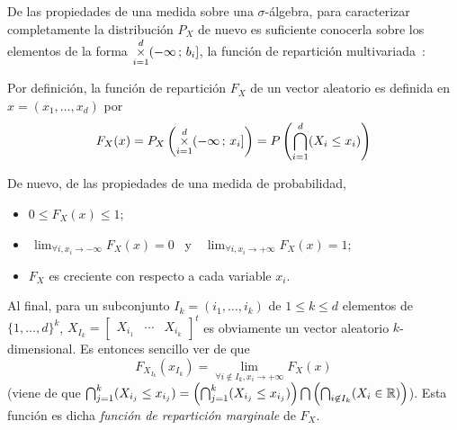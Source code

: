 De las propiedades de una medida sobre una $\sigma$-\'algebra, para caracterizar
completamente la distribuci\'on $P_X$ de nuevo es suficiente conocerla sobre los
elementos de  la forma $\displaystyle  \operatorname*{\times}_{i=1}^d (-\infty \, ;  \, b_i]$,
\ie  la funci\'on  de repartici\'on  multivariada~\cite{AthLah06,  Coh13, Bre88,
  HogMck13}:
%
\begin{definicion}
  Por  definici\'on,  la  funci\'on  de  repartici\'on  $F_X$  de  un vector
  aleatorio es definida en $x = (x_1 , \ldots , x_d)$ por
  \[
  F_X(x) =  P_X\left( \operatorname*{\times}_{i=1}^d (-\infty \,  ; \, x_i]  \right) = P\left(
    \bigcap_{i=1}^d (X_i \le x_i) \right)
  \]
\end{definicion}
%
De nuevo, de las propiedades de una medida de probabilidad,
%
\begin{itemize}
\item $0 \le F_X(x) \le 1$;
%
\item $\displaystyle  \, \lim_{\forall  i, x_i \to  -\infty} F_X(x)  = 0$ \  y \
  $\displaystyle \, \lim_{\forall i, x_i \to +\infty} F_X(x) = 1$;
%
\item $F_X$ es creciente con respecto a cada variable $x_i$.
\end{itemize}
%
Al  final, para  un subconjunto  $I_k =  (i_1,\ldots,i_k)$ de  $1 \le  k  \le d$
elementos de  $\{ 1  , \ldots ,  d \}^k$,  $X_{I_k} = \begin{bmatrix}  X_{i_1} &
  \cdots   &   X_{i_k}\end{bmatrix}^t$  es   obviamente   un  vector   aleatorio
$k$-dimensional. Es entonces sencillo ver de que
%
\[
F_{X_{I_k}}(x_{I_k}) = \lim_{\forall i \not\in I_k, x_i \to +\infty} F_X(x)
\label{pagina:MP:MarginalesF}
\]
%
(viene de  que $\bigcap_{j=1}^k (X_{i_j}  \le x_{i_j}) =  \left( \bigcap_{j=1}^k
  (X_{i_j} \le x_{i_j}) \right) \bigcap  \left( \bigcap_{i \not\in I_k} (X_i \in
  \mathbb{R})  \right)$). Esta  funci\'on es  dicha {\it  funci\'on  de repartici\'on
  marginale} de $F_X$.

